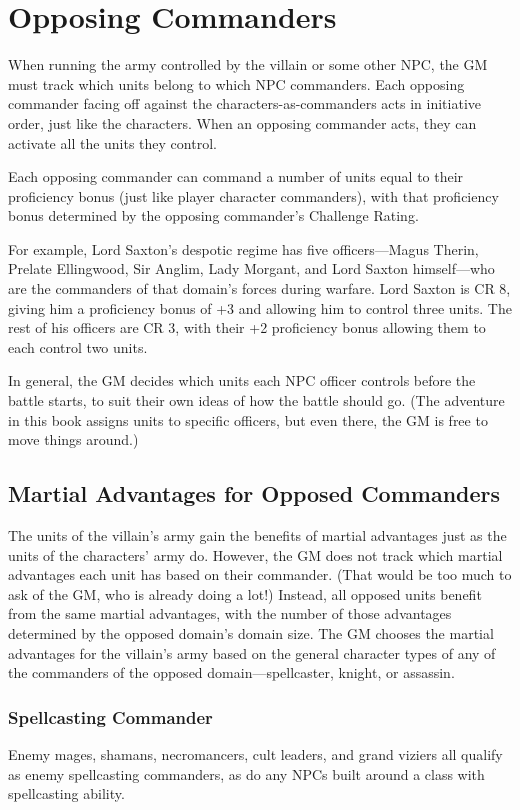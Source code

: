 \documentclass[10pt,a4paper,twoside,bg=print,twocolumn,openany,nodeprecatedcode]{dndbook}
\begin{document}
\section{Opposing Commanders}
When running the army controlled by the villain or some other NPC, the GM must track which units belong to which NPC commanders. Each opposing commander facing off against the characters-as-commanders acts in initiative order, just like the characters. When an opposing commander acts, they can activate all the units they control.

Each opposing commander can command a number of units equal to their proficiency bonus (just like player character commanders), with that proficiency bonus determined by the opposing commander's Challenge Rating.

For example, Lord Saxton's despotic regime has five officers—Magus Therin, Prelate Ellingwood, Sir Anglim, Lady Morgant, and Lord Saxton himself—who are the commanders of that domain's forces during warfare. Lord Saxton is CR 8, giving him a proficiency bonus of +3 and allowing him to control three units. The rest of his officers are CR 3, with their +2 proficiency bonus allowing them to each control two units.

In general, the GM decides which units each NPC officer controls before the battle starts, to suit their own ideas of how the battle should go. (The adventure in this book assigns units to specific officers, but even there, the GM is free to move things around.)

\subsection{Martial Advantages for Opposed Commanders}
The units of the villain's army gain the benefits of martial advantages just as the units of the characters' army do. However, the GM does not track which martial advantages each unit has based on their commander. (That would be too much to ask of the GM, who is already doing a lot!) Instead, all opposed units benefit from the same martial advantages, with the number of those advantages determined by the opposed domain's domain size. The GM chooses the martial advantages for the villain's army based on the general character types of any of the commanders of the opposed domain—spellcaster, knight, or assassin.

\subsubsection{Spellcasting Commander}
Enemy mages, shamans, necromancers, cult leaders, and grand viziers all qualify as enemy spellcasting commanders, as do any NPCs built around a class with spellcasting ability.
\end{document}
